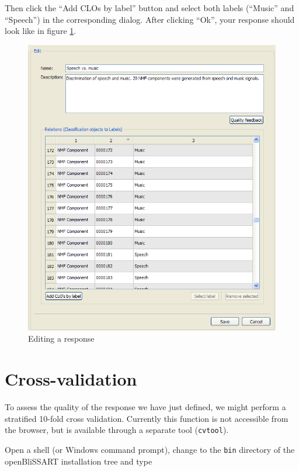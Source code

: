 Then click the ``Add CLOs by label'' button and select both labels (``Music''
and ``Speech'') in the corresponding dialog. After clicking ``Ok'', your
response should look like in figure \ref{figure:TutorialEditResponse}.

\begin{figure}
    \centering
    \includegraphics[width=\textwidth]{tutorial-media/EditResponse.png}
    \caption{%
        \label{figure:TutorialEditResponse}%
        Editing a response
    }
\end{figure}


\section{Cross-validation}

To assess the quality of the response we have just defined, we might perform a
stratified 10-fold cross validation. Currently this function is not accessible
from the browser, but is available through a separate tool ({\tt cvtool}).

Open a shell (or Windows command prompt), change to the {\tt bin} directory of
the openBliSSART installation tree and type

